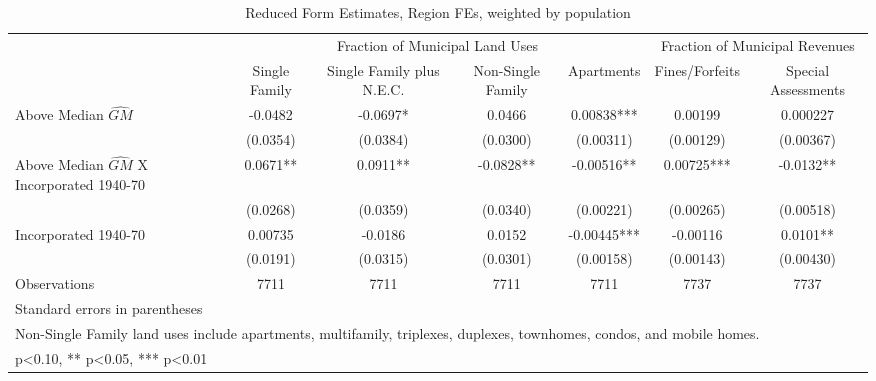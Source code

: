 \begin{table}[htbp]\centering
\def\sym#1{\ifmmode^{#1}\else\(^{#1}\)\fi}
\caption{Reduced Form Estimates, Region FEs, weighted by population}
\begin{tabular}{l*{6}{c}}
\toprule
                    &\multicolumn{4}{c}{Fraction of Municipal Land Uses}            &\multicolumn{2}{c}{Fraction of Municipal Revenues}\\\cmidrule(lr){2-5}\cmidrule(lr){6-7}
                    &\multicolumn{1}{c}{Single Family}&\multicolumn{1}{c}{Single Family plus N.E.C.}&\multicolumn{1}{c}{Non-Single Family}&\multicolumn{1}{c}{Apartments}&\multicolumn{1}{c}{Fines/Forfeits}&\multicolumn{1}{c}{Special Assessments}\\
\midrule
Above Median $\widehat{GM}$&     -0.0482   &     -0.0697*  &      0.0466   &     0.00838***&     0.00199   &    0.000227   \\
                    &    (0.0354)   &    (0.0384)   &    (0.0300)   &   (0.00311)   &   (0.00129)   &   (0.00367)   \\
\addlinespace
Above Median $\widehat{GM}$ X Incorporated 1940-70&      0.0671** &      0.0911** &     -0.0828** &    -0.00516** &     0.00725***&     -0.0132** \\
                    &    (0.0268)   &    (0.0359)   &    (0.0340)   &   (0.00221)   &   (0.00265)   &   (0.00518)   \\
\addlinespace
Incorporated 1940-70&     0.00735   &     -0.0186   &      0.0152   &    -0.00445***&    -0.00116   &      0.0101** \\
                    &    (0.0191)   &    (0.0315)   &    (0.0301)   &   (0.00158)   &   (0.00143)   &   (0.00430)   \\
\midrule
Observations        &        7711   &        7711   &        7711   &        7711   &        7737   &        7737   \\
\bottomrule
\multicolumn{7}{l}{\footnotesize Standard errors in parentheses}\\
\multicolumn{7}{l}{\footnotesize Non-Single Family land uses include apartments, multifamily, triplexes, duplexes, townhomes, condos, and mobile homes.}\\
\multicolumn{7}{l}{\footnotesize * p<0.10, ** p<0.05, *** p<0.01}\\
\end{tabular}
\end{table}

